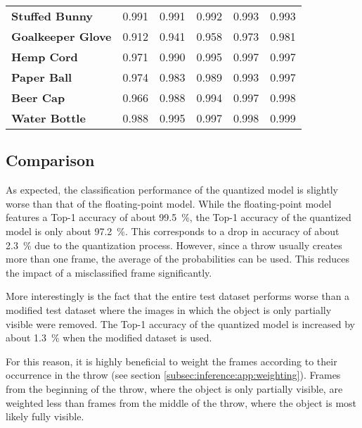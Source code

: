 \begin{table}
\begin{tabular}{llllll}
    \textbf{Stuffed Bunny} & \num{0.991} & \num{0.991} & \num{0.992} & \num{0.993} & \num{0.993} \\
    \textbf{Goalkeeper Glove} & \num{0.912} & \num{0.941} & \num{0.958} & \num{0.973} & \num{0.981} \\
    \textbf{Hemp Cord} & \num{0.971} & \num{0.990} & \num{0.995} & \num{0.997} & \num{0.997} \\
    \textbf{Paper Ball} & \num{0.974} & \num{0.983} & \num{0.989} & \num{0.993} & \num{0.997} \\
    \textbf{Beer Cap} & \num{0.966} & \num{0.988} & \num{0.994} & \num{0.997} & \num{0.998} \\
    \textbf{Water Bottle} & \num{0.988} & \num{0.995} & \num{0.997} & \num{0.998} & \num{0.999} \\
    \bottomrule
  \end{tabular}
\end{table}

\subsection{Comparison}
\label{subsec:verification_and_benchmark:classification_performance:comparison}

As expected, the classification performance of the quantized model is slightly worse than that of the floating-point model.
While the floating-point model features a Top-1 accuracy of about \SI{99.5}{\percent}, the Top-1 accuracy of the quantized model is only about \SI{97.2}{\percent}.
This corresponds to a drop in accuracy of about \SI{2.3}{\percent} due to the quantization process.
However, since a throw usually creates more than one frame, the average of the probabilities can be used.
This reduces the impact of a misclassified frame significantly.

More interestingly is the fact that the entire test dataset performs worse than a modified test dataset where the images in which the object is only partially visible were removed.
The Top-1 accuracy of the quantized model is increased by about \SI{1.3}{\percent} when the modified dataset is used.

For this reason, it is highly beneficial to weight the frames according to their occurrence in the throw (see section \ref{subsec:inference:app:weighting}).
Frames from the beginning of the throw, where the object is only partially visible, are weighted less than frames from the middle of the throw, where the object is most likely fully visible.
